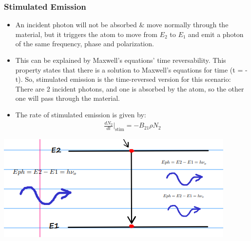 \documentclass[11pt]{article}
\begin{document}
\subsubsection{Stimulated Emission}
\begin{itemize}
    \item An incident photon will not be absorbed \& move normally through the material, but it triggers the atom to move from $E_2$ to $E_1$ and emit a photon of the same frequency, phase and polarization. 
    \item This can be explained by Maxwell's equations' time reversability. This property states that there is a solution to Maxwell's equations for time (t = -t). So, stimulated emission is the time-reversed version for this scenario: There are 2 incident photons, and one is absorbed by the atom, so the other one will pass through the material.
    \item The rate of stimulated emission is given by:
    \begin{align*}
        \frac{dN_2}{dt} \bigg|_{\text{stim}} = -B_{21} \rho N_2
    \end{align*}
\end{itemize}
\begin{center}
    \includegraphics[scale=1]{4.png}
\end{center}
\end{document}
